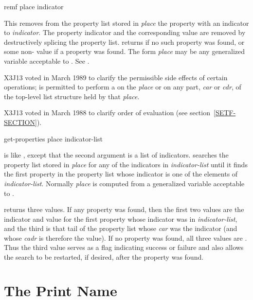 \begin{defmac}
remf place indicator

This removes from the property list stored in \emph{place}
the property with an indicator 
to \emph{indicator}.  The property indicator and the corresponding
value are removed by destructively splicing the property
list.   returns {\false} if no such property was found,
or some non-{\nil} value if a property was found.
The form \emph{place} may be any generalized variable acceptable to .
See .

\begin{newer}
X3J13 voted in March 1989 
to clarify the permissible side effects of certain operations;
 is permitted to perform a 
on the \emph{place} or on any part, \emph{car} or \emph{cdr}, of the
top-level list structure held by that \emph{place}.
\end{newer}

\begin{newer}
X3J13 voted in March 1988 
to clarify order of evaluation (see section~\ref{SETF-SECTION}).
\end{newer}
\end{defmac}

\begin{defun}[Function]
get-properties place indicator-list

 is like , except that the second
argument is a list of indicators.   searches the
property list stored in \emph{place} for any of the indicators in
\emph{indicator-list} until it finds the first property
in the property list whose indicator is one of
the elements of \emph{indicator-list}.  Normally \emph{place} is computed from
a generalized variable acceptable to .

 returns three values.
If any property was found, then
the first two values are the indicator
and value for the first property whose indicator was in \emph{indicator-list},
and the third is that tail of the property list whose \emph{car}
was the indicator (and whose \emph{cadr} is therefore the value).
If no property was found, all three values are {\nil}.
Thus the third value serves as a flag indicating success or failure
and also allows the search to be restarted, if desired, after the property
was found.
\end{defun}

\section{The Print Name}

